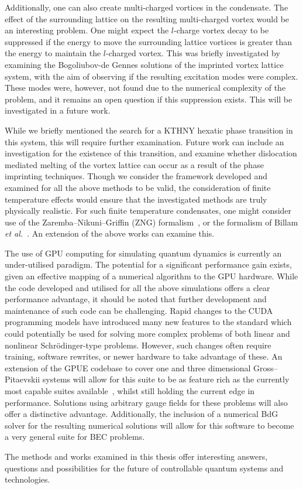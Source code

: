 Additionally, one can also create multi-charged vortices in the condensate. The effect of the surrounding lattice on the resulting multi-charged vortex would be an interesting problem. One might expect the $l$-charge vortex decay to be suppressed if the energy to move the surrounding lattice vortices is greater than the energy to maintain the $l$-charged vortex. This was briefly investigated by examining the Bogoliubov-de Gennes solutions of the imprinted vortex lattice system, with the aim of observing if the resulting excitation modes were complex. These modes were, however, not found due to the numerical complexity of the problem, and it remains an open question if this suppression exists. This will be investigated in a future work.

While we briefly mentioned the search for a KTHNY hexatic phase transition in this system, this will require further examination. Future work can include an investigation for the existence of this transition, and examine whether dislocation mediated melting of the vortex lattice can occur as a result of the phase imprinting techniques. Though we consider the framework developed and examined for all the above methods to be valid, the consideration of finite temperature effects would ensure that the investigated methods are truly physically realistic. For such finite temperature condensates, one might consider use of the Zaremba--Nikuni--Griffin (ZNG) formalism~\cite{ZNG_ref, BK:Proukakis_finitetemp_2013}, or the formalism of Billam \textit{et al.}~\cite{BEC:Billam_pra_2013}. An extension of the above works can examine this.

The use of GPU computing for simulating quantum dynamics is currently an under-utilised paradigm. The potential for a significant performance gain exists, given an effective mapping of a numerical algorithm to the GPU hardware. While the code developed and utilised for all the above simulations offers a clear performance advantage, it should be noted that further development and maintenance of such code can be challenging. Rapid changes to the CUDA programming models have introduced many new features to the standard which could potentially be used for solving more complex problems of both linear and nonlinear Schr\"odinger-type problems. However, such changes often require training, software rewrites, or newer hardware to take advantage of these. An extension of the GPUE codebase to cover one and three dimensional Gross--Pitaevskii systems will allow for this suite to be as feature rich as the currently most capable suites available~\cite{NUM:Wittek_cpc_2013,NUM:GPElab_1}, whilst still holding the current edge in performance. Solutions using arbitrary gauge fields for these problems will also offer a distinctive advantage. Additionally, the inclusion of a numerical BdG solver for the resulting numerical solutions will allow for this software to become a very general suite for BEC problems.

The methods and works examined in this thesis offer interesting answers, questions and possibilities for the future of controllable quantum systems and technologies.
